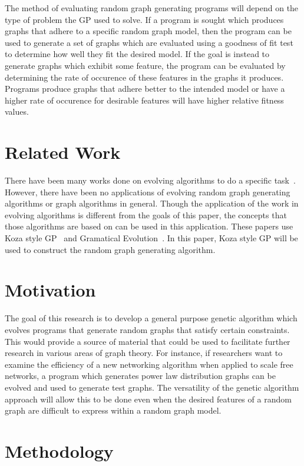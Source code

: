 \documentclass{article}
\begin{document}
The method of evaluating random graph generating programs will depend on the type of problem the GP used to solve. If a program is sought which produces graphs that adhere to a specific random graph model, then the program can be used to generate a set of graphs which are evaluated using a goodness of fit test to determine how well they fit the desired model. If the goal is instead to generate graphs which exhibit some feature, the program can be evaluated by determining the rate of occurence of these features in the graphs it produces. Programs produce graphs that adhere better to the intended model or have a higher rate of occurence for desirable features will have higher relative fitness values.

 \section{Related Work}
There have been many works done on evolving algorithms to do a specific 
task~\cite{Lourenco:12,Martin:13}. However, there have been no applications of evolving
random graph generating algorithms or graph algorithms in general. Though the application of 
the work in evolving algorithms is different from the goals of this paper, the concepts that
those algorithms are based on can be used in this application. These papers use Koza style 
GP~\cite{Koza:92} and Gramatical Evolution~\cite{Ryan:98}. In this paper, Koza
style GP will be used to construct the random graph generating algorithm. 

\section{Motivation}

The goal of this research is to develop a general purpose genetic algorithm which evolves programs that generate random graphs that satisfy certain constraints. This would provide a source of material that could be used to facilitate further research in various areas of graph theory. For instance, if researchers want to examine the efficiency of a new networking algorithm when applied to scale free networks, a program which generates power law distribution graphs can be evolved and used to generate test graphs. The versatility of the genetic algorithm approach will allow this to be done even when the desired features of a random graph are difficult to express within a random graph model.

\section{Methodology}
\end{document}
